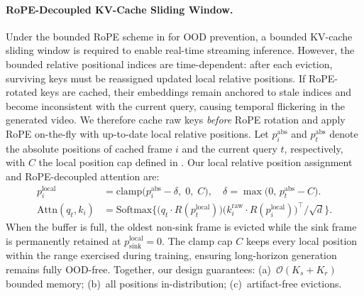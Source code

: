 \paragraph{RoPE-Decoupled KV-Cache Sliding Window. }
\label{sec:rope_decouple}
Under the bounded RoPE scheme in  for OOD prevention, 
a bounded KV-cache sliding window is required to enable real-time streaming inference. 
However, the bounded relative positional indices are
time-dependent: 
after each eviction, surviving keys must be reassigned updated local 
relative positions. 
If RoPE-rotated keys are cached, their embeddings remain anchored to stale
indices and become inconsistent with the current query, causing temporal
flickering in the generated video. 
We therefore cache raw keys \emph{before} RoPE rotation and apply RoPE on-the-fly
with up-to-date local relative positions. 
Let $p^{\text{abs}}_i$ and $p^{\text{abs}}_t$ denote the absolute positions of 
cached frame $i$ and the current query $t$, respectively, with $C$ the local position cap defined in .
Our local relative position assignment and RoPE-decoupled attention are:
\begin{align}
  p^{\text{local}}_i &= \text{clamp}\!\bigl(p^{\text{abs}}_i - \delta,\; 0,\; C\bigr),
    \quad \delta = \max\!\bigl(0,\, p^{\text{abs}}_t - C\bigr). \label{eq:local_pos} \\
  \text{Attn}(q_t, k_i) &= \text{Softmax}\{\bigl(q_t \cdot R(p^{\text{local}}_t)\bigr)
    \bigl(k_i^{\text{raw}} \cdot R(p^{\text{local}}_i)\bigr)^\top / \sqrt{d} \}.
  \label{eq:rope_decouple}
\end{align}
When the buffer is full, the oldest non-sink frame is evicted while the sink frame is
permanently retained at $p_{\text{sink}}^{\text{local}}{=}0$. The clamp cap $C$
keeps every local position within the range exercised during training,
ensuring long-horizon generation remains fully OOD-free. 
Together, our design guarantees: (a)~$\mathcal{O}(K_s + K_r)$ bounded memory;
(b)~all positions in-distribution; (c)~artifact-free evictions.
